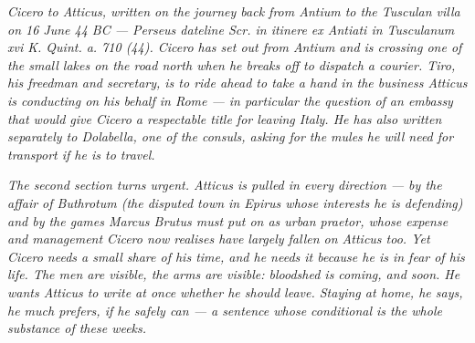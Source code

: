
\textit{Cicero to Atticus, written on the journey back from
Antium to the Tusculan villa on 16 June 44 BC --- Perseus
dateline \textit{Scr. in itinere ex Antiati in Tusculanum xvi
K. Quint. a. 710 (44)}. Cicero has set out from Antium and is
crossing one of the small lakes on the road north when he
breaks off to dispatch a courier. Tiro, his freedman and
secretary, is to ride ahead to take a hand in the business
Atticus is conducting on his behalf in Rome --- in particular
the question of an embassy that would give Cicero a respectable
title for leaving Italy. He has also written separately to
Dolabella, one of the consuls, asking for the mules he will
need for transport if he is to travel.}

\textit{The second section turns urgent. Atticus is pulled in
every direction --- by the affair of Buthrotum (the disputed
town in Epirus whose interests he is defending) and by the
games Marcus Brutus must put on as urban praetor, whose expense
and management Cicero now realises have largely fallen on
Atticus too. Yet Cicero needs a small share of his time, and
he needs it because he is in fear of his life. The men are
visible, the arms are visible: bloodshed is coming, and soon.
He wants Atticus to write at once whether he should leave.
Staying at home, he says, he much prefers, if he safely can ---
a sentence whose conditional is the whole substance of these
weeks.}

